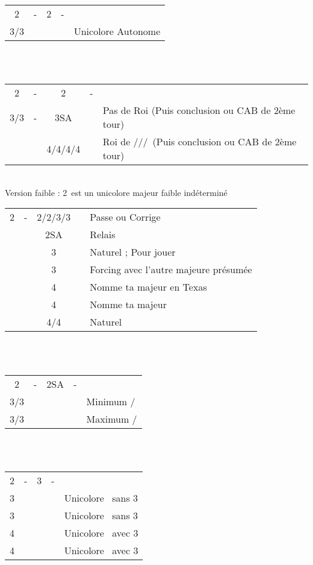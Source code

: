 \documentclass[a4paper, oneside, 11pt]{report}
\begin{document}
		\begin{tabular}{cccc|l}
		2\trefle & - & 2\carreau & - &\\
		3\coeur/3\pique &&&& Unicolore Autonome\\
		\end{tabular}\\\\
		
		\begin{tabular}{cccc|l}
		2\trefle & - & 2\carreau & - &\\
		3\coeur/3\pique & - & 3SA && Pas de Roi (Puis conclusion ou CAB de 2ème tour)\\
		&& 4\trefle/4\carreau/4\coeur/4\pique && Roi de \trefle/\carreau/\coeur/\pique\ (Puis conclusion ou CAB de 2ème tour)\\
		\end{tabular}\\

	Version faible : 2\carreau\ est un unicolore majeur faible indéterminé\\

	\begin{tabular}{cccc|l}
	2\carreau & - & 2\coeur/2\pique/3\coeur/3\pique && Passe ou Corrige\\
	&& 2SA && Relais\\
	&& 3\trefle && Naturel ; Pour jouer\\
	&& 3\carreau && Forcing avec l'autre majeure présumée\\
	&& 4\trefle && Nomme ta majeur en Texas\\
	&& 4\carreau && Nomme ta majeur\\
	&& 4\coeur/4\pique && Naturel\\
	\end{tabular}\\\\

	\begin{tabular}{cccc|l}
	2\carreau & - & 2SA & - &\\
	3\trefle/3\carreau &&&& Minimum \coeur/\pique\\
	3\coeur/3\pique &&&& Maximum \pique/\coeur\\
	\end{tabular}\\\\
	
	\begin{tabular}{cccc|l}
	2\carreau & - & 3\carreau & - &\\
	3\coeur &&&& Unicolore \coeur\ sans 3\pique\\
	3\pique &&&& Unicolore \pique\ sans 3\coeur\\
	4\trefle &&&& Unicolore \coeur\ avec 3\pique\\
	4\carreau &&&& Unicolore \pique\ avec 3\coeur\\
	\end{tabular}\\\\
\end{document}
